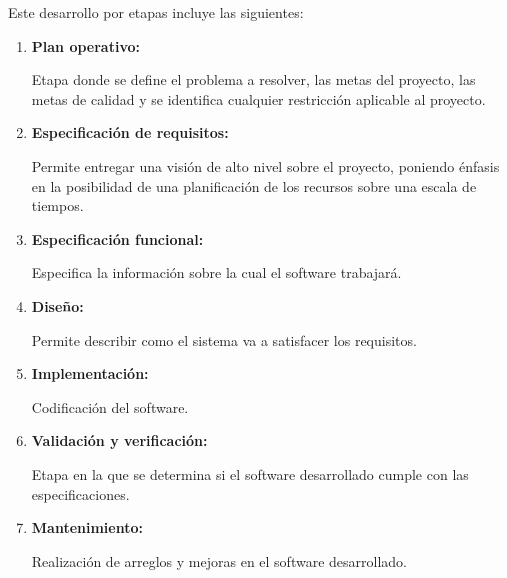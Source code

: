 Este desarrollo por etapas incluye las siguientes:

\begin{enumerate}
	\item \textbf{Plan operativo:}

	Etapa donde se define el problema a resolver, las metas del proyecto, las metas de calidad y se identifica cualquier restricción aplicable al proyecto.

	\item \textbf{Especificación de requisitos:}

	Permite entregar una visión de alto nivel sobre el proyecto, poniendo énfasis en la posibilidad de una planificación de los recursos sobre una escala de tiempos.

	\item \textbf{Especificación funcional:}

	Especifica la información sobre la cual el software trabajará.

	\item \textbf{Diseño:}

	Permite describir como el sistema va a satisfacer los requisitos.

	\item \textbf{Implementación:}

	Codificación del software.

	\item \textbf{Validación y verificación:}

	Etapa en la que se determina si el software desarrollado cumple con las especificaciones.
	
	\item \textbf{Mantenimiento:}

	Realización de arreglos y mejoras en el software desarrollado.

\end{enumerate}